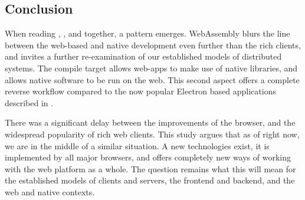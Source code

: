 









\subsection{Conclusion}
\label{sec:background-web-conclusion}

When reading , , and  together, a pattern emerges. 
WebAssembly blurs the line between the web-based and native development even further than the rich clients, and invites a further re-examination of our established models of distributed systems.
The compile target allows web-apps to make use of native libraries, and allows native software to be run on the web.
This second aspect offers a complete reverse workflow compared to the now popular Electron based applications described in .
 
There was a significant delay between the improvements of the browser, and the widespread popularity of rich web clients. 
This study argues that as of right now, we are in the middle of a similar situation. 
A new technologies exist, it is implemented by all major browsers, and offers completely new ways of working with the web platform as a whole. 
The question remains what this will mean for the established models of clients and servers, the frontend and backend, and the web and native contexts. 

